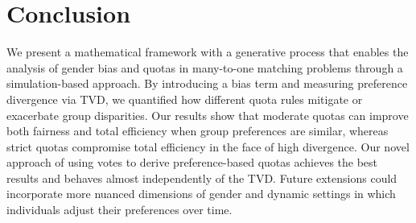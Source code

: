 \documentclass[letterpaper]{article}
\begin{document}
\section{Conclusion}
We present a mathematical framework with a generative process that enables the analysis of gender bias and quotas in many-to-one matching problems through a simulation-based approach. By introducing a bias term and measuring preference divergence via TVD, we quantified how different quota rules mitigate or exacerbate group disparities. Our results show that moderate quotas can improve both fairness and total efficiency when group preferences are similar, whereas strict quotas compromise total efficiency in the face of high divergence. Our novel approach of using votes to derive preference-based quotas achieves the best results and behaves almost independently of the TVD. Future extensions could incorporate more nuanced dimensions of gender and dynamic settings in which individuals adjust their preferences over time.




\end{document}
